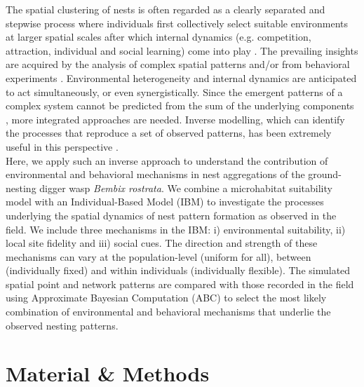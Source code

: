 \documentclass[10pt, twoside]{book} %
\begin{document}
	The spatial clustering of nests is often regarded as a clearly separated and stepwise process where individuals first collectively select suitable environments at larger spatial scales after which internal dynamics (e.g. competition, attraction, individual and social learning) come into play \citep{melles2009, swift2017}. The prevailing insights are acquired by the analysis of complex spatial patterns and/or from behavioral experiments \citep[e.g.][]{polidori2008, melles2009, asis2014}. Environmental heterogeneity and internal dynamics are anticipated to act simultaneously, or even synergistically. Since the emergent patterns of a complex system cannot be predicted from the sum of the underlying components \citep{bradbury2014}, more integrated approaches are needed. Inverse modelling, which can identify the processes that reproduce a set of observed patterns, has been extremely useful in this perspective \citep{banks2014, curtsdotter2019}.\\
	
	Here, we apply such an inverse approach to understand the contribution of environmental and behavioral mechanisms in nest aggregations of the ground-nesting digger wasp \textit{Bembix rostrata}. We combine a microhabitat suitability model with an Individual-Based Model (IBM) to investigate the processes underlying the spatial dynamics of nest pattern formation as observed in the field. We include three mechanisms in the IBM: i) environmental suitability, ii) local site fidelity and iii) social cues. The direction and strength of these mechanisms can vary at the population-level (uniform for all), between (individually fixed) and within individuals (individually flexible). The simulated spatial point and network patterns are compared with those recorded in the field using Approximate Bayesian Computation (ABC) to select the most likely combination of environmental and behavioral mechanisms that underlie the observed nesting patterns.\\


	\section{Material \& Methods}
\end{document}
